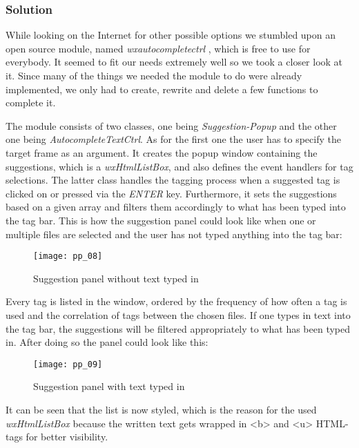 \subsubsection{Solution}
While looking on the Internet for other possible options we stumbled upon an open source module, named \emph{wxautocompletectrl} \cite{autocomplete}, which is free to use for everybody. It seemed to fit our needs extremely well so we took a closer look at it. Since many of the things we needed the module to do were already implemented, we only had to create, rewrite and delete a few functions to complete it. 

The module consists of two classes, one being \textit{Suggestion-Popup} and the other one being \textit{AutocompleteTextCtrl}. As for the first one the user has to specify the target frame as an argument. It creates the popup window containing the suggestions, which is a \textit{wxHtmlListBox}, and also defines the event handlers for tag selections. The latter class handles the tagging process when a suggested tag is clicked on or pressed via the \textit{ENTER} key. Furthermore, it sets the suggestions based on a given array and filters them accordingly to what has been typed into the tag bar.
This is how the suggestion panel could look like when one or multiple files are selected and the user has not typed anything into the tag bar:

\begin{figure}[H]
    \centering
    \texttt{[image: pp\_08]}
    \caption{Suggestion panel without text typed in}
\end{figure}

Every tag is listed in the window, ordered by the frequency of how often a tag is used and the correlation of tags between the chosen files. If one types in text into the tag bar, the suggestions will be filtered appropriately to what has been typed in. After doing so the panel could look like this:

\begin{figure}[H]
    \centering
    \texttt{[image: pp\_09]}
    \caption{Suggestion panel with text typed in}
\end{figure}

It can be seen that the list is now styled, which is the reason for the used \textit{wxHtmlListBox} because the written text gets wrapped in <b> and <u> HTML-tags for better visibility.


